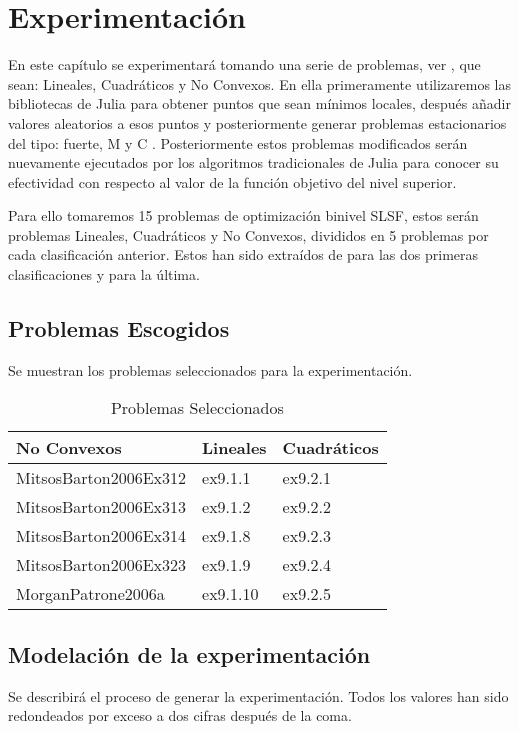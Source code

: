 \chapter{Experimentación}
En este capítulo se experimentará tomando una serie de problemas, ver \cite{BolibTestProblems}, 
que sean: Lineales, Cuadráticos y No Convexos. En ella primeramente utilizaremos las bibliotecas de Julia
para obtener puntos que sean mínimos locales, después añadir valores aleatorios a esos puntos y posteriormente 
generar problemas estacionarios del tipo: fuerte, M y C . Posteriormente estos problemas modificados serán nuevamente
ejecutados por los algoritmos tradicionales de Julia para conocer su efectividad con respecto al valor de la función objetivo del nivel superior.


Para ello tomaremos 15 problemas de optimización binivel SLSF, estos serán problemas 
Lineales, Cuadráticos y No Convexos, divididos en 5 problemas por cada clasificación anterior.
Estos han sido extraídos de \cite{Floudas1999HandbookOT} para las dos primeras clasificaciones y \cite{BolibTestProblems} para la última.

\newpage
\section{Problemas Escogidos}
Se muestran los problemas seleccionados para la experimentación.

\begin{table}[h!]
\centering
\caption{Problemas Seleccionados}
\begin{tabular}{ | m{5cm} | m{5cm} | m{5cm} | }
  
  \hline
  \textbf{No Convexos} & \textbf{Lineales} & \textbf{Cuadráticos} \\
  \hline
  MitsosBarton2006Ex312 & ex9.1.1 & ex9.2.1 \\
  \hline
  MitsosBarton2006Ex313 & ex9.1.2 & ex9.2.2 \\
  \hline
  MitsosBarton2006Ex314 & ex9.1.8 & ex9.2.3\\
  \hline
  MitsosBarton2006Ex323 & ex9.1.9 & ex9.2.4\\
  \hline
  MorganPatrone2006a & ex9.1.10 & ex9.2.5 \\
  \hline
\end{tabular}
\end{table}



\newpage
\section{Modelación de la experimentación}
Se describirá el proceso de generar la experimentación. 
Todos los valores han sido redondeados por exceso a dos cifras después de la coma. 

